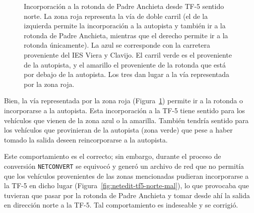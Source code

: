 \begin{figure}[ht]
\begin{subfigure}[t]{0.48\textwidth}
      \label{fig:salida-tf5-norte-cerca}
    \end{subfigure}%
    \caption[Incorporación a la rotonda de Padre Anchieta desde TF-5 sentido norte.]{Incorporación a la rotonda de Padre Anchieta desde TF-5 sentido norte. La zona roja representa la vía de doble carril (el de la izquierda permite la incorporación a la autopista y también ir a la rotonda de Padre Anchieta, mientras que el derecho permite ir a la rotonda únicamente). La azul se corresponde con la carretera proveniente del IES Viera y Clavijo. El carril verde es el proveniente de la autopista, y el amarillo el proveniente de la rotonda que está por debajo de la autopista. Los tres dan lugar a la vía representada por la zona roja.}
    \label{fig:salida-tf5-norte}
\end{figure}

Bien, la vía representada por la zona roja (Figura~\ref{fig:salida-tf5-norte-cerca}) permite ir a la rotonda o incorporarse a la autopista. Esta incorporación a la TF-5 tiene sentido para los vehículos que vienen de la zona azul o la amarilla. También tendría sentido para los vehículos que provinieran de la autopista (zona verde) que pese a haber tomado la salida deseen reincorporarse a la autopista.

Este comportamiento es el correcto; sin embargo, durante el proceso de conversión \texttt{NETCONVERT} se equivocó y generó un archivo de red que no permitía que los vehículos provenientes de las zonas mencionadas pudieran incorporarse a la TF-5 en dicho lugar (Figura~\ref{fig:netedit-tf5-norte-mal}), lo que provocaba que tuvieran que pasar por la rotonda de Padre Anchieta y tomar desde ahí la salida en dirección norte a la TF-5. Tal comportamiento es indeseable y se corrigió.

